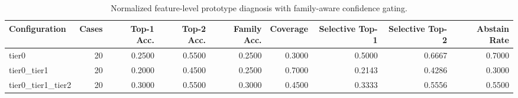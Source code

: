 \begin{table}[t]
\centering
\caption{Normalized feature-level prototype diagnosis with family-aware confidence gating.}
\label{tab:dice_stressor_hierarchical_diagnosis}
\footnotesize
\begin{tabular}{lrrrrrrrr}
\toprule
Configuration & Cases & Top-1 Acc. & Top-2 Acc. & Family Acc. & Coverage & Selective Top-1 & Selective Top-2 & Abstain Rate \\
\midrule
tier0 & 20 & 0.2500 & 0.5500 & 0.2500 & 0.3000 & 0.5000 & 0.6667 & 0.7000 \\
tier0_tier1 & 20 & 0.2000 & 0.4500 & 0.2500 & 0.7000 & 0.2143 & 0.4286 & 0.3000 \\
tier0_tier1_tier2 & 20 & 0.3000 & 0.5500 & 0.3000 & 0.4500 & 0.3333 & 0.5556 & 0.5500 \\
\bottomrule
\end{tabular}

\end{table}
